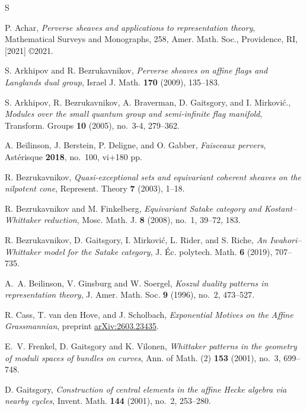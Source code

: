 \documentclass{amsart}
\theoremstyle{definition}
\begin{document}
    \begin{thebibliography}{S}

        P. Achar, {\it Perverse sheaves and applications to representation theory}, Mathematical Surveys and Monographs, 258, Amer. Math. Soc., Providence, RI, [2021] \copyright 2021.

        S. Arkhipov and R. Bezrukavnikov, {\it Perverse sheaves on affine flags and Langlands dual group}, Israel J. Math. {\bf 170} (2009), 135--183.

        S. Arkhipov, R. Bezrukavnikov, A. Braverman, D. Gaitsgory, and I. Mirković., {\it Modules over the small quantum group and semi-infinite flag manifold}, Transform. Groups {\bf 10} (2005), no.~3-4, 279--362.

        A. Beĭlinson, J. Berstein, P. Deligne, and O. Gabber, {\it Faisceaux pervers}, Ast\'erisque {\bf 2018}, no.~100, vi+180 pp.

        R. Bezrukavnikov, {\it Quasi-exceptional sets and equivariant coherent sheaves on the nilpotent cone}, Represent. Theory {\bf 7} (2003), 1--18.

        R. Bezrukavnikov and M. Finkelberg, {\it Equivariant Satake category and Kostant--Whittaker reduction}, Mosc. Math. J. {\bf 8} (2008), no.~1, 39--72, 183.

        R. Bezrukavnikov, D. Gaitsgory, I. Mirković, L. Rider, and S. Riche, {\it An Iwahori--Whittaker model for the Satake category}, J. \'Ec. polytech. Math. {\bf 6} (2019), 707--735.

        A.~A. Beilinson, V. Ginsburg and W. Soergel, {\it Koszul duality patterns in representation theory}, J. Amer. Math. Soc. {\bf 9} (1996), no.~2, 473--527.

        R. Cass, T. van den Hove, and J. Scholbach, {\it Exponential Motives on the Affine Grassmannian}, preprint \href{https://arxiv.org/abs/2603.23435}{arXiv:2603.23435}.

        E.~V. Frenkel, D. Gaitsgory and K. Vilonen, {\it Whittaker patterns in the geometry of moduli spaces of bundles on curves}, Ann. of Math. (2) {\bf 153} (2001), no.~3, 699--748.

        D. Gaitsgory, {\it Construction of central elements in the affine Hecke algebra via nearby cycles}, Invent. Math. {\bf 144} (2001), no.~2, 253--280.


\end{thebibliography}
\end{document}
